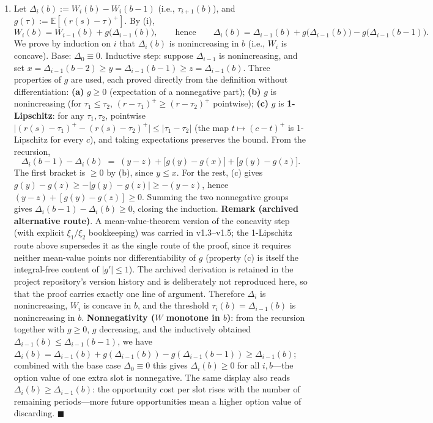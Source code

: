 \documentclass[
  11pt]{article}
\providecommand{\tightlist}{%
  \setlength{\itemsep}{0pt}\setlength{\parskip}{0pt}}
\begin{document}
\begin{enumerate}
\def\labelenumi{(\roman{enumi})}
\setcounter{enumi}{2}
\tightlist
\item
  Let \(\Delta_i(b) := W_i(b) - W_i(b-1)\) (i.e., \(\tau_{i+1}(b)\)),
  and \(g(\tau) := \mathbb{E}[(r(s)-\tau)^+]\). By (i),
  \[W_i(b) = W_{i-1}(b) + g\big(\Delta_{i-1}(b)\big), \qquad\text{hence}\qquad \Delta_i(b) = \Delta_{i-1}(b) + g\big(\Delta_{i-1}(b)\big) - g\big(\Delta_{i-1}(b-1)\big).\]
  We prove by induction on \(i\) that \(\Delta_i(b)\) is nonincreasing
  in \(b\) (i.e., \(W_i\) is concave). Base: \(\Delta_0 \equiv 0\).
  Inductive step: suppose \(\Delta_{i-1}\) is nonincreasing, and set
  \(x = \Delta_{i-1}(b-2) \ge y = \Delta_{i-1}(b-1) \ge z = \Delta_{i-1}(b)\).
  Three properties of \(g\) are used, each proved directly from the
  definition without differentiation: \textbf{(a)} \(g \ge 0\)
  (expectation of a nonnegative part); \textbf{(b)} \(g\) is
  nonincreasing (for \(\tau_1 \le \tau_2\),
  \((r-\tau_1)^+ \ge (r-\tau_2)^+\) pointwise); \textbf{(c)} \(g\) is
  \textbf{1-Lipschitz}: for any \(\tau_1, \tau_2\), pointwise
  \(\big|(r(s)-\tau_1)^+ - (r(s)-\tau_2)^+\big| \le |\tau_1 - \tau_2|\)
  (the map \(t \mapsto (c-t)^+\) is 1-Lipschitz for every \(c\)), and
  taking expectations preserves the bound. From the recursion,
  \[\Delta_i(b-1) - \Delta_i(b) \;=\; (y-z) + \big[g(y)-g(x)\big] + \big[g(y)-g(z)\big].\]
  The first bracket is \(\ge 0\) by (b), since \(y \le x\). For the
  rest, (c) gives \(g(y)-g(z) \ge -|g(y)-g(z)| \ge -(y-z)\), hence
  \((y-z) + [g(y)-g(z)] \ge 0\). Summing the two nonnegative groups
  gives \(\Delta_i(b-1) - \Delta_i(b) \ge 0\), closing the induction.
  \textbf{Remark (archived alternative route)}. A mean-value-theorem
  version of the concavity step (with explicit \(\xi_1/\xi_2\)
  bookkeeping) was carried in v1.3--v1.5; the 1-Lipschitz route above
  supersedes it as the single route of the proof, since it requires
  neither mean-value points nor differentiability of \(g\) (property (c)
  is itself the integral-free content of \(|g'|\le 1\)). The archived
  derivation is retained in the project repository's version history and
  is deliberately not reproduced here, so that the proof carries exactly
  one line of argument. Therefore \(\Delta_i\) is nonincreasing, \(W_i\)
  is concave in \(b\), and the threshold \(\tau_i(b) = \Delta_{i-1}(b)\)
  is nonincreasing in \(b\). \textbf{Nonnegativity (\(W\) monotone in
  \(b\))}: from the recursion together with \(g \ge 0\), \(g\)
  decreasing, and the inductively obtained
  \(\Delta_{i-1}(b) \le \Delta_{i-1}(b-1)\), we have
  \(\Delta_i(b) = \Delta_{i-1}(b) + g(\Delta_{i-1}(b)) - g(\Delta_{i-1}(b-1)) \ge \Delta_{i-1}(b)\);
  combined with the base case \(\Delta_0 \equiv 0\) this gives
  \(\Delta_i(b) \ge 0\) for all \(i, b\)---the option value of one extra
  slot is nonnegative. The same display also reads
  \(\Delta_i(b) \ge \Delta_{i-1}(b)\): the opportunity cost per slot
  rises with the number of remaining periods---more future opportunities
  mean a higher option value of discarding. \(\blacksquare\)
\end{enumerate}
\end{document}
